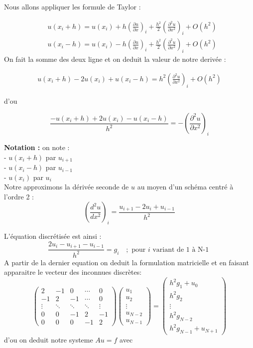 \documentclass[12pt]{report}
\begin{document}
Nous allons appliquer les formule de Taylor :

$$
\begin{aligned}
&u\left(x_{i}+h\right)=u\left(x_{i}\right)+h\left(\frac{\partial u}{\partial x}\right)_{i}+\frac{h^{2}}{2}\left(\frac{\partial^{2} u}{\partial x^{2}}\right)_{i}+O\left(h^{2}\right) \\
&u\left(x_{i}-h\right)=u\left(x_{i}\right)-h\left(\frac{\partial u}{\partial x}\right)_{i}+\frac{h^{2}}{2}\left(\frac{\partial^{2} u}{\partial x^{2}}\right)_{i}+O\left(h^{2}\right)
\end{aligned}
$$
On fait la somme des deux ligne et on deduit la valeur de notre derivée :

$$
\begin{array}{r}
u\left(x_{i}+h\right)-2 u\left(x_{i}\right)+u\left(x_{i}-h\right)=h^{2}\left(\frac{\partial^{2} u}{\partial x^{2}}\right)_{i}+O\left(h^{2}\right)
\end{array}
$$

d'ou

$$
\frac{-u\left(x_{i}+h\right)+2 u\left(x_{i}\right)-u\left(x_{i}-h\right)}{h^{2}}=-\left(\frac{\partial^{2} u}{\partial x^{2}}\right)_{i}
$$

\textbf{Notation :} 
on note :\\[0.3cm]
- $u\left(x_{i}+h\right)$ par $u_{i+1}$\\ 
- $u\left(x_{i}-h\right)$ par $u_{i-1}$ \\
- $u\left(x_{i}\right)$ par $u_{i}$\\

Notre approximons la dérivée seconde de $u$ au moyen d'un schéma centré à l'ordre 2 :
$$
\left(\frac{d^{2} u}{d x^{2}}\right)_{i}=\frac{u_{i+1}-2 u_{i}+u_{i-1}}{h^{2}}
$$

L'équation discrétisée est ainsi :
$$
\frac{2 u_{i}-u_{i+1}-u_{i-1}}{h^{2}}=g_{i} \quad ; \text { pour } i \text { variant de } 1 \text { à N-1 }
$$
A partir de la dernier equation on deduit la formulation matricielle et en faisant apparaitre le vecteur des inconnues discrètes:
$$
\left(\begin{array}{ccccc}
2 & -1 & 0 & \cdots & 0 \\
-1 & 2 & -1 & \cdots & 0 \\
\vdots & \ddots & \ddots & \ddots & \vdots \\
0 & 0 & -1 & 2 & -1 \\
0 & 0 & 0 & -1 & 2
\end{array}\right)\left(\begin{array}{c}
u_{1} \\
u_{2} \\
\vdots \\
u_{N-2} \\
u_{N-1}
\end{array}\right)=\left(\begin{array}{c}
h^{2}g_{1}+u_{0} \\
h^{2}g_{2} \\
\vdots \\
h^{2}g_{N-2} \\
h^{2}g_{N-1}+u_{N+1}
\end{array}\right)
$$
d'ou on deduit notre systeme $Au=f$ avec\\
 
\end{document}
